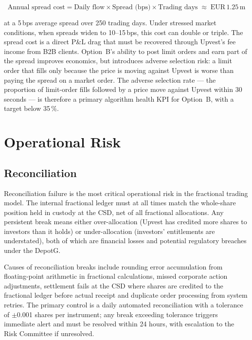 \documentclass[12pt,a4paper]{report}
\begin{document}
\begin{equation}
  \text{Annual spread cost} = \text{Daily flow} \times \text{Spread (bps)}
  \times \text{Trading days} \;\approx\; \text{EUR}\, 1.25\,\text{m}
\end{equation}

at a 5\,bps average spread over 250 trading days. Under stressed market conditions,
when spreads widen to 10--15\,bps, this cost can double or triple. The spread cost is a
direct P\&L drag that must be recovered through Upvest's fee income from B2B clients.
Option~B's ability to post limit orders and earn part of the spread improves economics,
but introduces adverse selection risk: a limit order that fills only because the price is
moving against Upvest is worse than paying the spread on a market order. The adverse
selection rate --- the proportion of limit-order fills followed by a price move against
Upvest within 30 seconds --- is therefore a primary algorithm health KPI for Option~B,
with a target below 35\,\%.

\section{Operational Risk}

\subsection{Reconciliation}

Reconciliation failure is the most critical operational risk in the fractional trading
model. The internal fractional ledger must at all times match the whole-share position
held in custody at the CSD, net of all fractional allocations. Any persistent break
means either over-allocation (Upvest has credited more shares to investors than it holds)
or under-allocation (investors' entitlements are understated), both of which are
financial losses and potential regulatory breaches under the DepotG.

Causes of reconciliation breaks include rounding error accumulation from floating-point
arithmetic in fractional calculations, missed corporate action adjustments, settlement
fails at the CSD where shares are credited to the fractional ledger before actual receipt
and duplicate order processing from system retries. The primary control is a daily
automated reconciliation with a tolerance of $\pm$0.001 shares per instrument; any break
exceeding tolerance triggers immediate alert and must be resolved within 24 hours, with
escalation to the Risk Committee if unresolved.
\end{document}
